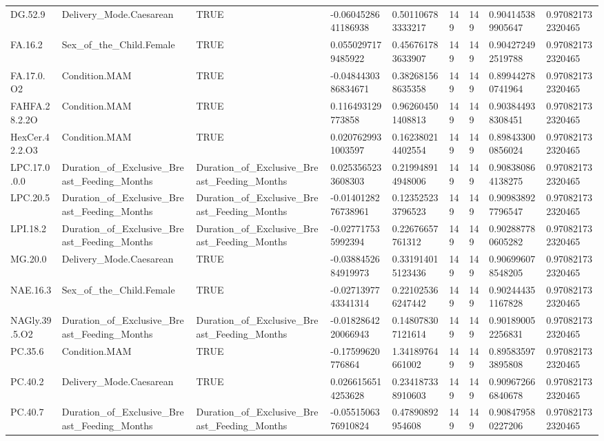 \begin{longtable}{lllllllll}
DG.52.9 & Delivery\_Mode.Caesarean & TRUE & -0.0604528641186938 & 0.501106783333217 & 149 & 149 & 0.904145389905647 & 0.970821732320465 \\
FA.16.2 & Sex\_of\_the\_Child.Female & TRUE & 0.0550297179485922 & 0.456761783633907 & 149 & 149 & 0.904272492519788 & 0.970821732320465 \\
FA.17.0.O2 & Condition.MAM & TRUE & -0.0484430386834671 & 0.382681568635358 & 149 & 149 & 0.899442780741964 & 0.970821732320465 \\
FAHFA.28.2.2O & Condition.MAM & TRUE & 0.116493129773858 & 0.962604501408813 & 149 & 149 & 0.903844938308451 & 0.970821732320465 \\
HexCer.42.2.O3 & Condition.MAM & TRUE & 0.0207629931003597 & 0.162380214402554 & 149 & 149 & 0.898433000856024 & 0.970821732320465 \\
LPC.17.0.0.0 & Duration\_of\_Exclusive\_Breast\_Feeding\_Months & Duration\_of\_Exclusive\_Breast\_Feeding\_Months & 0.0253565233608303 & 0.219948914948006 & 149 & 149 & 0.908380864138275 & 0.970821732320465 \\
LPC.20.5 & Duration\_of\_Exclusive\_Breast\_Feeding\_Months & Duration\_of\_Exclusive\_Breast\_Feeding\_Months & -0.0140128276738961 & 0.123525233796523 & 149 & 149 & 0.909838927796547 & 0.970821732320465 \\
LPI.18.2 & Duration\_of\_Exclusive\_Breast\_Feeding\_Months & Duration\_of\_Exclusive\_Breast\_Feeding\_Months & -0.027717535992394 & 0.22676657761312 & 149 & 149 & 0.902887780605282 & 0.970821732320465 \\
MG.20.0 & Delivery\_Mode.Caesarean & TRUE & -0.0388452684919973 & 0.331914015123436 & 149 & 149 & 0.906996078548205 & 0.970821732320465 \\
NAE.16.3 & Sex\_of\_the\_Child.Female & TRUE & -0.0271397743341314 & 0.221025366247442 & 149 & 149 & 0.902444351167828 & 0.970821732320465 \\
NAGly.39.5.O2 & Duration\_of\_Exclusive\_Breast\_Feeding\_Months & Duration\_of\_Exclusive\_Breast\_Feeding\_Months & -0.0182864220066943 & 0.148078307121614 & 149 & 149 & 0.901890052256831 & 0.970821732320465 \\
PC.35.6 & Condition.MAM & TRUE & -0.17599620776864 & 1.34189764661002 & 149 & 149 & 0.895835973895808 & 0.970821732320465 \\
PC.40.2 & Delivery\_Mode.Caesarean & TRUE & 0.0266156514253628 & 0.234187338910603 & 149 & 149 & 0.909672666840678 & 0.970821732320465 \\
PC.40.7 & Duration\_of\_Exclusive\_Breast\_Feeding\_Months & Duration\_of\_Exclusive\_Breast\_Feeding\_Months & -0.0551506376910824 & 0.47890892954608 & 149 & 149 & 0.908479580227206 & 0.970821732320465 \\

\end{longtable}
